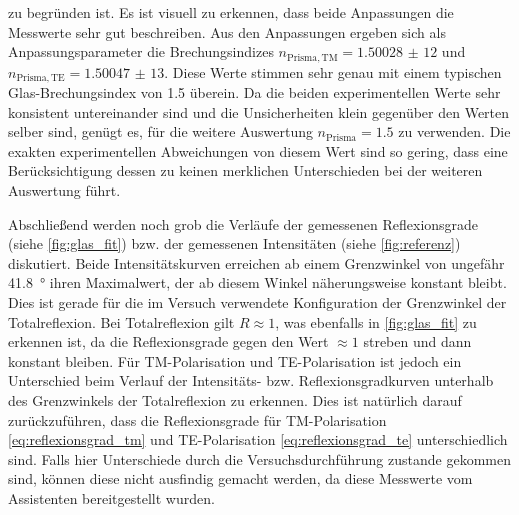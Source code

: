 zu begründen ist. Es ist visuell zu erkennen, dass beide Anpassungen die Messwerte sehr gut beschreiben. Aus den Anpassungen ergeben sich als Anpassungsparameter
die Brechungsindizes $n_{\mathrm{Prisma,TM}} = \num{1,50028(12)}$ und $n_{\mathrm{Prisma,TE}} = \num{1,50047(13)}$. Diese Werte stimmen sehr genau mit einem
typischen Glas-Brechungsindex von \num{1,5} überein. Da die beiden experimentellen Werte sehr konsistent untereinander sind und die Unsicherheiten klein gegenüber
den Werten selber sind, genügt es, für die weitere Auswertung $n_{\mathrm{Prisma}} = \num{1,5}$ zu verwenden. Die exakten experimentellen Abweichungen von diesem
Wert sind so gering, dass eine Berücksichtigung dessen zu keinen merklichen Unterschieden bei der weiteren Auswertung führt.\par
Abschließend werden noch grob die Verläufe der gemessenen Reflexionsgrade (siehe \cref{fig:glas_fit}) bzw. der gemessenen Intensitäten (siehe \cref{fig:referenz})
diskutiert. Beide Intensitätskurven erreichen ab einem Grenzwinkel von ungefähr \SI{41,8}{\degree} ihren Maximalwert, der ab diesem Winkel näherungsweise konstant bleibt.
Dies ist gerade für die im Versuch verwendete Konfiguration der Grenzwinkel der Totalreflexion. Bei Totalreflexion gilt $R \approx 1$, was ebenfalls in \cref{fig:glas_fit}
zu erkennen ist, da die Reflexionsgrade gegen den Wert $\approx 1$ streben und dann konstant bleiben. Für TM-Polarisation und TE-Polarisation ist jedoch ein Unterschied
beim Verlauf der Intensitäts- bzw. Reflexionsgradkurven unterhalb des Grenzwinkels der Totalreflexion zu erkennen. Dies ist natürlich darauf zurückzuführen, dass
die Reflexionsgrade für TM-Polarisation \ref{eq:reflexionsgrad_tm} und TE-Polarisation \ref{eq:reflexionsgrad_te} unterschiedlich sind. Falls hier Unterschiede durch die
Versuchsdurchführung zustande gekommen sind, können diese nicht ausfindig gemacht werden, da diese Messwerte vom Assistenten bereitgestellt wurden.\newpage
